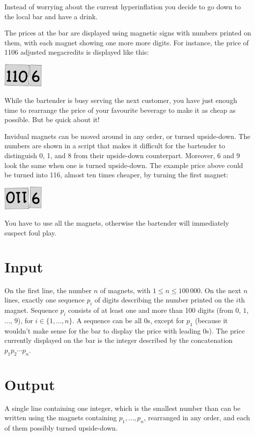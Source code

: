 

Instead of worrying about the current hyperinflation you decide to go down to the local bar and have a drink.

The prices at the bar are displayed using magnetic signs with numbers printed on them, with each magnet showing one more more digits.
For instance, the price of 1106 adjusted megacredits is displayed like this:

\medskip
\includegraphics[width = 2cm]{img/from.png}

While the bartender is busy serving the next customer, you have just enough time to rearrange the price of your favourite beverage to make it as cheap as possible.
But be quick about it!

Invidual magnets can be moved around in any order, or turned upside-down.
The numbers are shown in a script that makes it difficult for the bartender to distinguish 0, 1, and 8 from their upside-down counterpart.
Moreover, 6 and 9 look the same when one is turned upside-down.
The example price above could be turned into 116, almost ten times cheaper, by turning the first magnet:

\medskip
\includegraphics[width = 2cm]{img/to.png}

You have to use all the magnets, otherwise the bartender will immediately suspect foul play.

\section*{Input}

On the first line, the number $n$ of magnets, with $1\leq n\leq 100\,000$.
On the next $n$ lines, exactly one sequence $p_i$ of digits describing the number printed on the $i$th magnet.
Sequence $p_i$ consists of at least one and more than 100 digits (from $0$, $1$, $\ldots$, $9$), for $i\in\{1,\ldots, n\}$.
A sequence can be all $0$s, except for $p_1$ (because it wouldn't make sense for the bar to display the price with leading $0$s).
The price currently displayed on the bar is the integer described by the concatenation $p_1p_2\cdots p_n$.

\section*{Output}

A single line containing one integer, which is the smallest number than can be written using the magnets containing $p_1,\ldots,p_n$, rearranged in any order, and each of them possibly turned upside-down.
